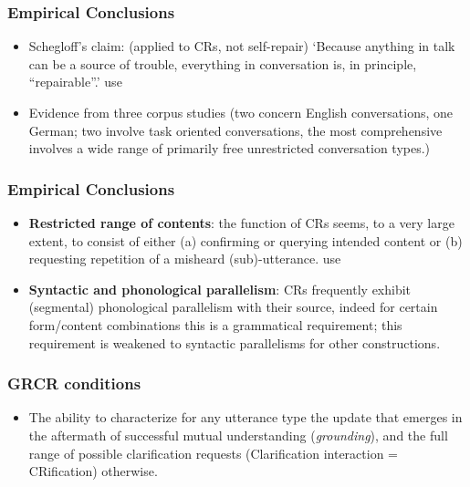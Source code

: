 \documentclass{beamer}
\newcommand{\bit}{\begin{itemize}}
\newcommand{\eit}{\end{itemize}}
\begin{document}
\begin{frame}\frametitle{Empirical Conclusions }
\bit
\item  Schegloff's claim: (applied to CRs, not self-repair) `Because anything in
talk can be a source of trouble, everything in conversation is, in
principle, ``repairable''.' 
use
\item Evidence from three corpus studies \cite{pgh01,rs04,riesermoore05} (two concern English
  conversations, one German; two involve task oriented conversations,
  the most comprehensive involves a wide range of primarily free
  unrestricted conversation types.)

\eit
\end{frame}
\begin{frame}\frametitle{Empirical Conclusions }
\bit
\item {\bf Restricted range of contents}: the function of CRs seems, to a
  very large extent, to consist of either (a)
  confirming or querying intended content or (b) requesting repetition of
  a misheard (sub)-utterance.
use
\item {\bf Syntactic and phonological parallelism}: CRs frequently exhibit
  (segmental) phonological parallelism with their source,  indeed for certain
form/content combinations this is a grammatical requirement; this requirement is
weakened to syntactic parallelisms for other constructions.


 

\eit
\end{frame}


\begin{frame}\frametitle{  GRCR conditions   }

\bit
\item  The
  ability to characterize for any utterance type the update that
  emerges in the aftermath of successful mutual understanding ({\it grounding}), and  the
  full range of possible clarification requests (Clarification interaction  = CRification) otherwise.
\eit



\end{frame}
\end{document}
